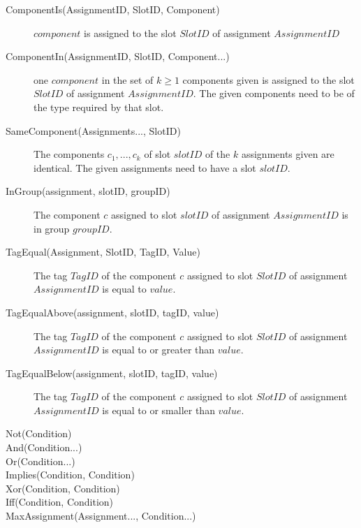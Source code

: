 \begin{description}
\item[ComponentIs(AssignmentID, SlotID, Component)]
$component$ is assigned to the slot $SlotID$ of assignment $AssignmentID$

\item[ComponentIn(AssignmentID, SlotID, Component...)]	
one $component$ in the set of $k\geq 1$ components given is assigned to the slot $SlotID$ of assignment $AssignmentID$. The given components need to be of the type required by that slot. 

\item[SameComponent(Assignments..., SlotID)]	
The components $c_1,...,c_k$ of slot $slotID$ of the $k$ assignments given are identical. The given assignments need to have a slot $slotID$. 

\item[InGroup(assignment, slotID, groupID)]	
The component $c$ assigned to slot $slotID$ of assignment $AssignmentID$ is in group $groupID$. 
		
\item[TagEqual(Assignment, SlotID, TagID, Value)]	
The tag $TagID$ of the component $c$ assigned to slot $SlotID$ of assignment $AssignmentID$ is equal to $value$. 
	
\item[TagEqualAbove(assignment, slotID, tagID, value)]	
The tag $TagID$ of the component $c$ assigned to slot $SlotID$ of assignment $AssignmentID$ is equal to or greater than $value$. 
	
\item[TagEqualBelow(assignment, slotID, tagID, value)]		
The tag $TagID$ of the component $c$ assigned to slot $SlotID$ of assignment $AssignmentID$ is equal to or smaller than $value$. 
	
\item[Not(Condition)]	
	
	
\item[And(Condition...)]
	

\item[Or(Condition...)]
	

\item[Implies(Condition, Condition)]
	
	
\item[Xor(Condition, Condition)]	
	

\item[Iff(Condition, Condition)]	
	
\item[MaxAssignment(Assignment..., Condition...)]	
	

\end{description}
